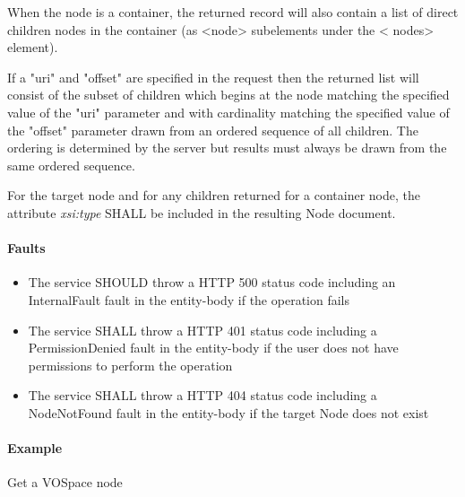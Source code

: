 \documentclass[11pt,a4paper]{ivoa}
\begin{document}
When the node is a container, the returned record will also contain a list of direct children nodes in the container (as <node> subelements under the < nodes> element).

If a "uri" and "offset" are specified in the request then the returned list will consist of the subset of children which begins at the node matching the specified value of the "uri" parameter and with cardinality matching the specified value of the "offset" parameter drawn from an ordered sequence of all children. The ordering is determined by the server but results must always be drawn from the same ordered sequence.

For the target node and for any children returned for a container node, the attribute \emph{xsi:type} SHALL be included in the resulting Node document.  

\paragraph{Faults}
\begin{itemize}
    \item The service SHOULD throw a HTTP 500 status code including an InternalFault fault in the entity-body if the operation fails
    \item The service SHALL throw a HTTP 401 status code including a PermissionDenied fault in the entity-body if the user does not have permissions to perform the operation
    \item The service SHALL throw a HTTP 404 status code including a NodeNotFound fault in the entity-body if the target Node does not exist
\end{itemize}

\paragraph{Example}
Get a VOSpace node
\end{document}
